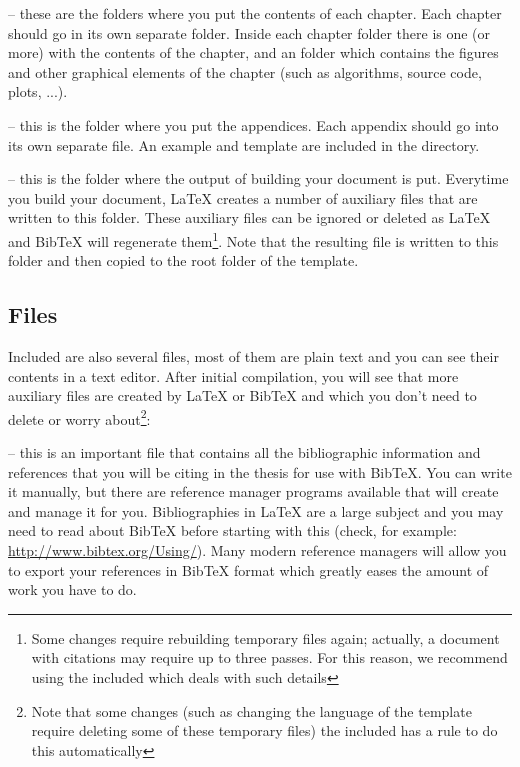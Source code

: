  -- these are the folders where you put the contents of each chapter. Each chapter should go in its own separate folder. Inside each chapter folder there is one (or more)  with the contents of the chapter, and an  folder which contains the figures and other graphical elements of the chapter (such as algorithms, source code, plots, ...).

 -- this is the folder where you put the appendices. Each appendix should go into its own separate  file. An example and template are included in the directory.

 -- this is the folder where the output of building your document is put. Everytime you build your document,
 \LaTeX{} creates a number of auxiliary files that are written to this folder. These auxiliary files can be ignored or deleted as \LaTeX{} and BibTeX will regenerate them\footnote{Some changes require rebuilding temporary files again; actually, a document with citations may require up to three passes. For this reason, we recommend using the included  which deals with such details}. Note that the resulting  file is written to this folder and then copied to the root folder of the template.

\subsection{Files}

Included are also several files, most of them are plain text and you can see their contents in a text editor. After initial compilation, you will see that more auxiliary files are created by \LaTeX{} or BibTeX and which you don't need to delete or worry about\footnote{Note that some changes (such as changing the language of the template require deleting some of these temporary files) the included  has a  rule to do this automatically}:

 -- this is an important file that contains all the bibliographic information and references that you will be citing in the thesis for use with BibTeX. You can write it manually, but there are reference manager programs available that will create and manage it for you. Bibliographies in \LaTeX{} are a large subject and you may need to read about BibTeX before starting with this (check, for example: \url{http://www.bibtex.org/Using/}). Many modern reference managers will allow you to export your references in BibTeX format which greatly eases the amount of work you have to do.

